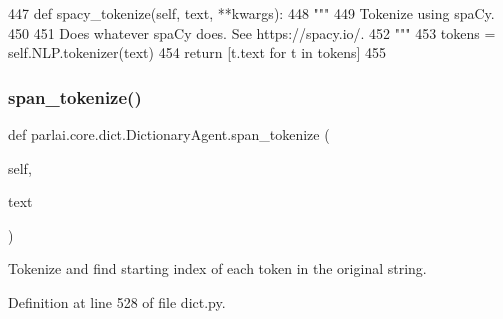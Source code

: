 \begin{DoxyCode}
447     \textcolor{keyword}{def }spacy\_tokenize(self, text, **kwargs):
448         \textcolor{stringliteral}{"""}
449 \textcolor{stringliteral}{        Tokenize using spaCy.}
450 \textcolor{stringliteral}{}
451 \textcolor{stringliteral}{        Does whatever spaCy does. See https://spacy.io/.}
452 \textcolor{stringliteral}{        """}
453         tokens = self.NLP.tokenizer(text)
454         \textcolor{keywordflow}{return} [t.text \textcolor{keywordflow}{for} t \textcolor{keywordflow}{in} tokens]
455 
\end{DoxyCode}
\mbox{\label{classparlai_1_1core_1_1dict_1_1DictionaryAgent_a8fede3cf83af6a47c5dd4bb356de3350}} 
\subsubsection{\texorpdfstring{span\+\_\+tokenize()}{span\_tokenize()}}
{\footnotesize\ttfamily def parlai.\+core.\+dict.\+Dictionary\+Agent.\+span\+\_\+tokenize (\begin{DoxyParamCaption}\item[{}]{self,  }\item[{}]{text }\end{DoxyParamCaption})}

\begin{DoxyVerb}Tokenize and find  starting index of each token in the original string.
\end{DoxyVerb}
 

Definition at line 528 of file dict.\+py.


